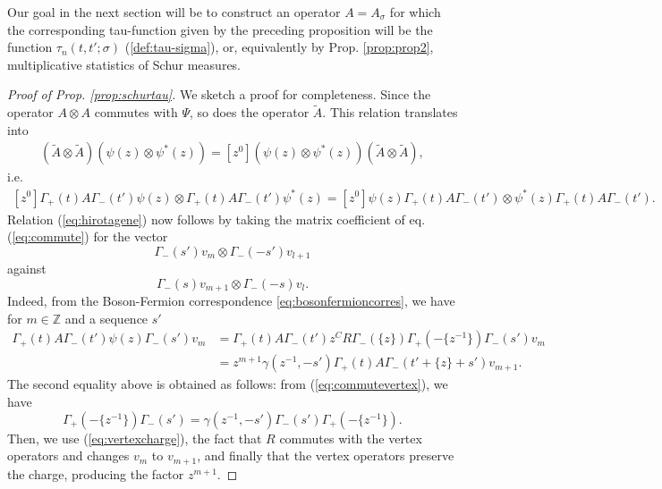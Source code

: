\documentclass[12pt]{amsart}
\theoremstyle{definition}
\newcommand{\Z}{\mathbb{Z}}
\begin{document}
Our goal in the next section will be to construct an operator $A=A_\sigma$ for which the corresponding tau-function given by the preceding proposition will be the function $\tau_n(t,t';\sigma)$ (\ref{def:tau-sigma}), or, equivalently by Prop. \ref{prop:prop2}, multiplicative statistics of Schur measures.
\begin{proof}[Proof of Prop. \ref{prop:schurtau}]
We sketch a proof for completeness. Since the operator $A \otimes A$ commutes with $\Psi$, so does the operator $\tilde{A}$. This relation translates into
\begin{align*}
[ z^0 ] \left( \tilde{A} \otimes \tilde{A} \right) \left( \psi(z) \otimes \psi^*(z) \right) = [z^0] \left( \psi(z) \otimes \psi^*(z) \right) \left( \tilde{A} \otimes \tilde{A} \right),
\end{align*}
i.e.
\begin{align} \label{eq:commute}
[z^0] \Gamma_+(t)A\Gamma_-(t') \psi(z) \otimes \Gamma_+(t)A\Gamma_-(t')  \psi^*(z) = [z^0] \psi(z) \Gamma_+(t)A\Gamma_-(t')  \otimes \psi^*(z) \Gamma_+(t)A\Gamma_-(t').
\end{align}
Relation (\ref{eq:hirotagene}) now follows by taking the matrix coefficient of eq. (\ref{eq:commute}) for the vector \[\Gamma_-(s') v_m \otimes \Gamma_-(-s') v_{l+1}\]
against
\[ \Gamma_-(s) v_{m+1} \otimes \Gamma_-(-s) v_{l}. \]
Indeed, from the Boson-Fermion correspondence \eqref{eq:bosonfermioncorres}, we have for $m \in \Z$ and a sequence $s'$
\begin{align*}
\Gamma_+(t) A \Gamma_-(t')\psi(z) \Gamma_-(s') v_m &= \Gamma_+(t) A \Gamma_-(t')z ^{C} R \Gamma_-( \{ z \} ) \Gamma_+( - \{ z^{-1} \} ) \Gamma_-( s') v_m \\
&= z^{m+1} \gamma ( z^{-1} , -s') \Gamma_+(t) A \Gamma_-(t'  + \{z\} + s' )v_{m+1}.
\end{align*}
The second equality above is obtained as follows: from (\ref{eq:commutevertex}), we have
\[ \Gamma_+( - \{ z^{-1} \} ) \Gamma_-( s') = \gamma ( z^{-1} , -s') \Gamma_-( s') \Gamma_+( - \{ z^{-1} \} ). \]
Then, we use (\ref{eq:vertexcharge}), the fact that $R$ commutes with the vertex operators and changes $v_m$ to $v_{m+1}$, and finally that the vertex operators preserve the charge, producing the factor $z^{m+1}$. 


\end{proof}
\end{document}
